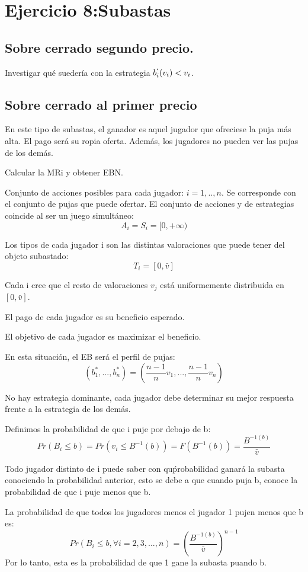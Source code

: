 \documentclass{article}
\begin{document}
\section{Ejercicio 8:Subastas}
\subsection{Sobre cerrado segundo precio.}
Investigar qu\'e sueder\'ia con la estrategia $b_i^`(v_i)<v_i$.
\subsection{Sobre cerrado al primer precio}

En este tipo de subastas, el ganador es aquel jugador que ofreciese la puja m\'as alta. El pago ser\'a su ropia oferta. Adem\'as, los jugadores no pueden ver las pujas de los dem\'as.

Calcular la MRi y obtener EBN.

Conjunto de acciones posibles para cada jugador: $i=1,..,n$. Se corresponde con el conjunto de pujas que puede ofertar.
El conjunto de acciones y de estrategias coincide al ser un juego simult\'aneo:
$$A_i=S_i=[0,+\infty)$$

Los tipos de cada jugador i son las distintas valoraciones que puede tener del objeto subastado:
$$T_i=[0,\bar{v}]$$

Cada i cree que el resto de valoraciones $v_j$ est\'a uniformemente distribuida en $[0,\bar{v}]$.

El pago de cada jugador es su beneficio esperado.

El objetivo de cada jugador es maximizar el beneficio.

En esta situaci\'on, el EB ser\'a el perfil de pujas:
$${(b_1^*,...,b_n^*)}={(\frac{n-1}{n}v_1,...,\frac{n-1}{n}v_n)}$$

No hay estrategia dominante, cada jugador debe determinar su mejor respuesta frente a la estrategia de los dem\'as.

Definimos la probabilidad de que i puje por debajo de b:
$$Pr(B_i\leq b)=Pr(v_i\leq B^{-1}(b))=F(B^{-1}(b))=\frac{B^{-1(b)}}{\bar{v}}$$

Todo jugador distinto de i puede saber con qu\'probabilidad ganar\'a la subasta conociendo la probabilidad anterior, esto se debe a que cuando puja b, conoce la probabilidad de que i puje menos que b.

La probabilidad de que todos los jugadores menos el jugador 1 pujen menos que b es:
$$Pr(B_i\leq b, \forall i=2,3,...,n)=(\frac{B^{-1(b)}}{\bar{v}})^{n-1}$$
 Por lo tanto, esta es la probabilidad de que 1 gane la subasta puando b.
\end{document}

